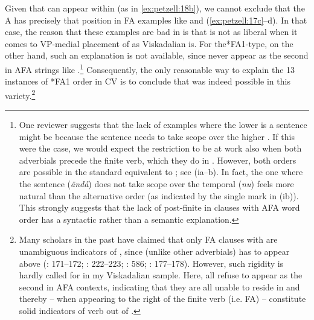 \documentclass[output=paper,colorlinks,citecolor=brown,draft,draftmode]{langscibook}
\begin{document}
Given that  can appear within  (as in \ref{ex:petzell:18b}), we cannot exclude that the A has precisely that position in FA examples like  and (\ref{ex:petzell:17c}–d). In that case, the reason that these examples are bad in  is that  is not as liberal when it comes to VP-medial placement of  as Viskadalian is. For the*FA1-type, on the other hand, such an explanation is not available, since  never appear as the second  in AFA strings like .\footnote{One
    reviewer suggests that the lack of examples where the lower  is a sentence  might be because the sentence  needs to take scope over the higher . If this were the case, we would expect the restriction to be at work also when both adverbials precede the finite verb, which they do in . However, both orders are possible in the standard equivalent to ; see (ia–b). In fact, the one where the sentence  (\textit{ändå}) does not take scope over the temporal (\textit{nu})  feels more natural than the alternative order (as indicated by the single  mark in (ib)). This strongly suggests that the lack of post-finite  in clauses with AFA word order has a syntactic rather than a semantic explanation.
    \ea
    \z
    \z
}
Consequently, the only reasonable way to explain the 13 instances of *FA1 order in CV is to conclude that  was indeed possible in this variety.\footnote{Many scholars in the past have claimed that only FA clauses with  are unambiguous indicators of  , since  (unlike other adverbials) has to appear above  (\citealt{Falk1993}: 171–172; \citealt{WiklundEtAl2007}: 222–223; \citealt{KoenemanZeijlstra2014}: 586; \citealt{HeycockSundquist2017}: 177–178). However, such rigidity is hardly called for in my Viskadalian sample. Here, all  refuse to appear as the second  in AFA contexts, indicating that they are all unable to reside in  and thereby – when appearing to the right of the finite verb (i.e. FA) – constitute solid indicators of verb  out of .}
\end{document}
